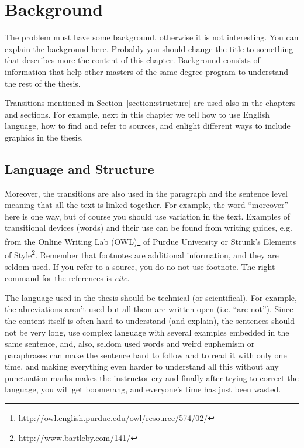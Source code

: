 \documentclass[12pt,a4paper,oneside,pdftex]{report}
\begin{document}
\chapter{Background}
\label{chapter:background}

The problem must have some background, otherwise it is not
interesting.  You can explain the background here. Probably you should
change the title to something that describes more the content of this
chapter. Background consists of information that help other masters of
the same degree program to understand the rest of the thesis.

Transitions mentioned in Section~\ref{section:structure} are used also
in the chapters and sections. For example, next in this chapter we
tell how to use English language, how to find and refer to sources,
and enlight different ways to include graphics in the thesis.

\section{Language and Structure}

Moreover, the transitions are also used in the paragraph and the
sentence level meaning that all the text is linked together. For example,
the word ``moreover'' here is one way, but of course you should use
variation in the text. Examples of transitional devices (words) and
their use can be found from writing guides, e.g. from the Online
Writing Lab
(OWL)\footnote{http://owl.english.purdue.edu/owl/resource/574/02/} of
Purdue University or Strunk's Elements of
Style\footnote{http://www.bartleby.com/141/}. Remember that footnotes
are additional information, and they are seldom used.  If you refer to a source, you do no
not use footnote. The right command for the references is \emph{cite}.

The language used in the thesis should be technical (or
scientifical). For example, the abreviations aren't used but all them
are written open (i.e. ``are not''). Since the content itself is often
hard to understand (and explain), the sentences should not be very
long, use complex language with several examples embedded in the same
sentence, and, also, seldom used words and weird euphemism or paraphrases
can make the sentence hard to follow and to read it with only one
time, and making everything even harder to understand all this without
any punctuation marks makes the instructor cry and finally after
trying to correct the language, you will get boomerang, and everyone's
time has just been wasted.
\end{document}
